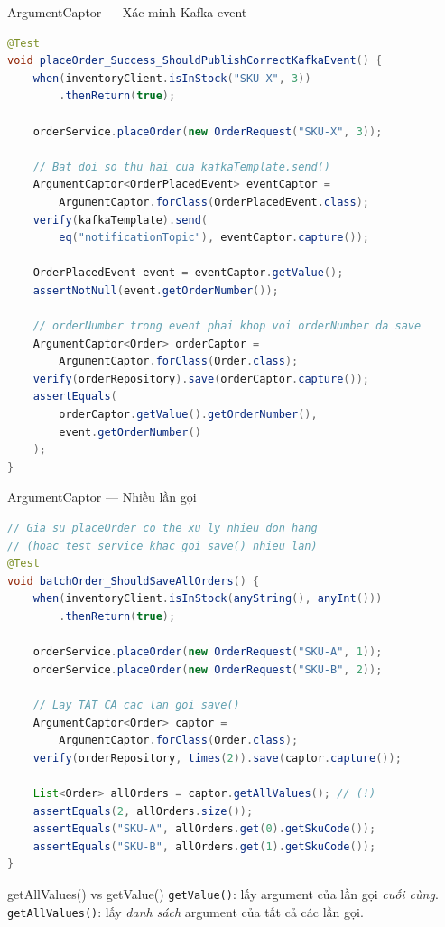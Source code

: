 \documentclass[aspectratio=169,10pt]{beamer}
\begin{document}
\begin{frame}[fragile,shrink=18]{ArgumentCaptor --- Xác minh Kafka event}
\begin{lstlisting}[language=java]
@Test
void placeOrder_Success_ShouldPublishCorrectKafkaEvent() {
    when(inventoryClient.isInStock("SKU-X", 3))
        .thenReturn(true);

    orderService.placeOrder(new OrderRequest("SKU-X", 3));

    // Bat doi so thu hai cua kafkaTemplate.send()
    ArgumentCaptor<OrderPlacedEvent> eventCaptor =
        ArgumentCaptor.forClass(OrderPlacedEvent.class);
    verify(kafkaTemplate).send(
        eq("notificationTopic"), eventCaptor.capture());

    OrderPlacedEvent event = eventCaptor.getValue();
    assertNotNull(event.getOrderNumber());

    // orderNumber trong event phai khop voi orderNumber da save
    ArgumentCaptor<Order> orderCaptor =
        ArgumentCaptor.forClass(Order.class);
    verify(orderRepository).save(orderCaptor.capture());
    assertEquals(
        orderCaptor.getValue().getOrderNumber(),
        event.getOrderNumber()
    );
}
\end{lstlisting}
\end{frame}

\begin{frame}[fragile,shrink=22]{ArgumentCaptor --- Nhiều lần gọi}
\begin{lstlisting}[language=java]
// Gia su placeOrder co the xu ly nhieu don hang
// (hoac test service khac goi save() nhieu lan)
@Test
void batchOrder_ShouldSaveAllOrders() {
    when(inventoryClient.isInStock(anyString(), anyInt()))
        .thenReturn(true);

    orderService.placeOrder(new OrderRequest("SKU-A", 1));
    orderService.placeOrder(new OrderRequest("SKU-B", 2));

    // Lay TAT CA cac lan goi save()
    ArgumentCaptor<Order> captor =
        ArgumentCaptor.forClass(Order.class);
    verify(orderRepository, times(2)).save(captor.capture());

    List<Order> allOrders = captor.getAllValues(); // (!)
    assertEquals(2, allOrders.size());
    assertEquals("SKU-A", allOrders.get(0).getSkuCode());
    assertEquals("SKU-B", allOrders.get(1).getSkuCode());
}
\end{lstlisting}

  \begin{block}{getAllValues() vs getValue()}
    \texttt{getValue()}: lấy argument của lần gọi \textit{cuối cùng}.\\
    \texttt{getAllValues()}: lấy \textit{danh sách} argument của tất cả các lần gọi.
  \end{block}
\end{frame}
\end{document}
